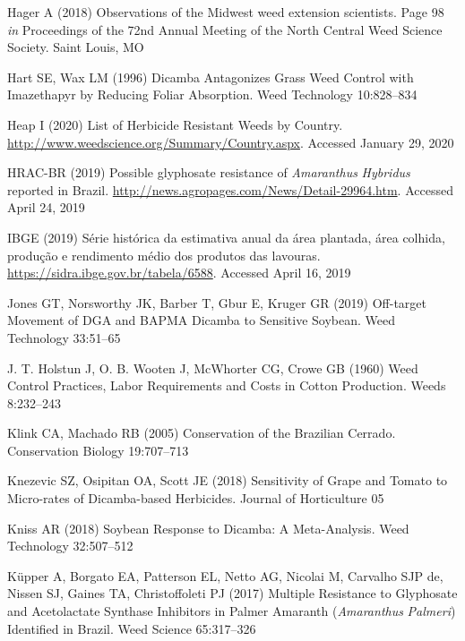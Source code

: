 \documentclass[
  12pt,
  a4paper]{article}
\begin{document}
\leavevmode\hypertarget{ref-hager_observations_2018}{}%
Hager A (2018) Observations of the Midwest weed extension scientists.
Page 98 \emph{in} Proceedings of the 72nd Annual Meeting of the North
Central Weed Science Society. Saint Louis, MO

\leavevmode\hypertarget{ref-hart_dicamba_1996}{}%
Hart SE, Wax LM (1996) Dicamba Antagonizes Grass Weed Control with
Imazethapyr by Reducing Foliar Absorption. Weed Technology 10:828--834

\leavevmode\hypertarget{ref-heap_list_2020}{}%
Heap I (2020) List of Herbicide Resistant Weeds by Country.
\url{http://www.weedscience.org/Summary/Country.aspx}. Accessed January
29, 2020

\leavevmode\hypertarget{ref-hrac-br_possible_2019}{}%
HRAC-BR (2019) Possible glyphosate resistance of \emph{Amaranthus}
\emph{Hybridus} reported in Brazil.
\url{http://news.agropages.com/News/Detail-29964.htm}. Accessed April
24, 2019

\leavevmode\hypertarget{ref-ibge_serie_2019}{}%
IBGE (2019) Série histórica da estimativa anual da área plantada, área
colhida, produção e rendimento médio dos produtos das lavouras.
\url{https://sidra.ibge.gov.br/tabela/6588}. Accessed April 16, 2019

\leavevmode\hypertarget{ref-jones_off-target_2019}{}%
Jones GT, Norsworthy JK, Barber T, Gbur E, Kruger GR (2019) Off-target
Movement of DGA and BAPMA Dicamba to Sensitive Soybean. Weed Technology
33:51--65

\leavevmode\hypertarget{ref-j._t._holstun_weed_1960}{}%
J. T. Holstun J, O. B. Wooten J, McWhorter CG, Crowe GB (1960) Weed
Control Practices, Labor Requirements and Costs in Cotton Production.
Weeds 8:232--243

\leavevmode\hypertarget{ref-klink_conservation_2005}{}%
Klink CA, Machado RB (2005) Conservation of the Brazilian Cerrado.
Conservation Biology 19:707--713

\leavevmode\hypertarget{ref-knezevic_sensitivity_2018}{}%
Knezevic SZ, Osipitan OA, Scott JE (2018) Sensitivity of Grape and
Tomato to Micro-rates of Dicamba-based Herbicides. Journal of
Horticulture 05

\leavevmode\hypertarget{ref-kniss_soybean_2018}{}%
Kniss AR (2018) Soybean Response to Dicamba: A Meta-Analysis. Weed
Technology 32:507--512

\leavevmode\hypertarget{ref-kupper_multiple_2017}{}%
Küpper A, Borgato EA, Patterson EL, Netto AG, Nicolai M, Carvalho SJP
de, Nissen SJ, Gaines TA, Christoffoleti PJ (2017) Multiple Resistance
to Glyphosate and Acetolactate Synthase Inhibitors in Palmer Amaranth
(\emph{Amaranthus} \emph{Palmeri}) Identified in Brazil. Weed Science
65:317--326
\end{document}
